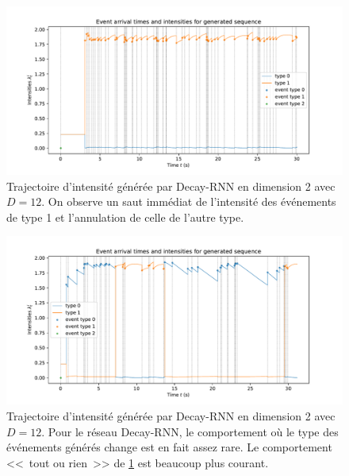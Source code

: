 \documentclass[../main.tex]{subfiles}
\begin{document}
\begin{figure}[htp]
	\includegraphics[width=\linewidth]{../results/intensity_Decay-RNN_2d_hidden12_20181201-003410.pdf}
	\caption{Trajectoire d'intensité générée par Decay-RNN en dimension 2 avec $D=12$. On observe un saut immédiat de l'intensité des événements de type 1 et l'annulation de celle de l'autre type.}\label{fig:hawkes2DDecayRNNintensityPlot}
\end{figure}

\begin{figure}[htp]
	\includegraphics[width=\linewidth]{../results/intensity_Decay-RNN_2d_hidden12_20181201-003410_RARE_TYPESWITCH.pdf}
	\caption{Trajectoire d'intensité générée par Decay-RNN en dimension 2 avec $D=12$. Pour le réseau Decay-RNN, le comportement où le type des événements générés change est en fait assez rare. Le comportement <<~tout ou rien~>> de \cref{fig:hawkes2DDecayRNNintensityPlot} est beaucoup plus courant.}\label{fig:hawkes2DDecayRNNintensityPlotRareBehaviour}
\end{figure}
\end{document}
